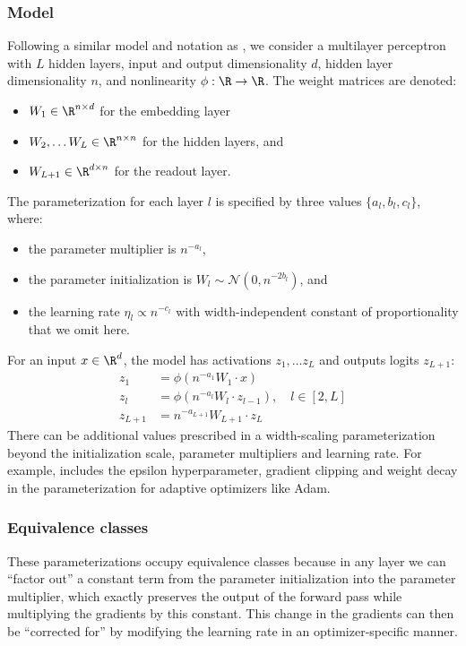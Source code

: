 \subsubsection{Model}
\label{app:theory_model}
Following a similar model and notation as \citet{yang2021tensoriv}, we consider a multilayer perceptron with $L$ hidden layers, input and output dimensionality $d$, hidden layer dimensionality $n$, and nonlinearity $\phi: \R \rightarrow \R$. The weight matrices are denoted:
\begin{itemize}
    \item $W_1 \in \R^{n \times d}$ for the embedding layer
    \item $W_2, \ldots W_L \in \R ^ {n \times n}$ for the hidden layers, and
    \item $W_{L+1} \in \R^{d \times n}$ for the readout layer.
\end{itemize}

The parameterization for each layer $l$ is specified by three values $\{a_l, b_l, c_l\}$, where:
\begin{itemize}
    \item the parameter multiplier is $n^{-a_l}$,
    \item the parameter initialization is $W_l \sim \mathcal{N}(0, n^{-2b_l})$, and
    \item  the learning rate $\eta_l \propto n^{-c_l}$ with width-independent constant of proportionality that we omit here.
\end{itemize}

For an input $x \in \R^d$, the model has activations $z_1, \ldots z_L$ and outputs logits $z_{L+1}$:
\begingroup
\begin{align*}
    z_1 &= \phi(n^{-a_1} W_1 \cdot x)\\
    z_l &= \phi(n^{-a_l} W_l \cdot z_{l-1}), \quad l \in [2, L]\\
    z_{L+1} &= n^{-a_{L+1}} W_{L+1} \cdot z_L
\end{align*}
\endgroup
There can be additional values prescribed in a width-scaling parameterization beyond the initialization scale, parameter multipliers and learning rate. For example, \citet{yang2023tensorivb} includes the epsilon hyperparameter, gradient clipping and weight decay in the parameterization for adaptive optimizers like Adam.

\subsubsection{Equivalence classes}
\label{app:theory_equivalence_classes}
These parameterizations occupy equivalence classes because in any layer we can ``factor out'' a constant term from the parameter initialization into the parameter multiplier, which exactly preserves the output of the forward pass while multiplying the gradients by this constant. This change in the gradients can then be ``corrected for'' by modifying the learning rate in an optimizer-specific manner.

